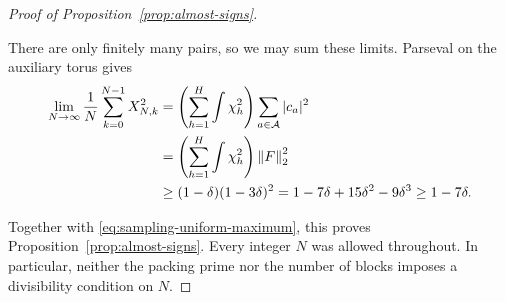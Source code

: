 \begin{proof}[Proof of Proposition~\ref{prop:almost-signs}]
\begin{samepage}
There are only finitely many pairs, so we may sum these limits.  Parseval
on the auxiliary torus gives
\begin{align}
 \lim_{N\to\infty}\frac1N\sum_{k=0}^{N-1}X_{N,k}^2
 &=\left(\sum_{h=1}^H\int\chi_h^2\right)
            \sum_{a\in\mathcal A}|c_a|^2
 \notag\\
 &=\left(\sum_{h=1}^H\int\chi_h^2\right)\left\lVert F\right\rVert_2^2
 \notag\\
 &\ge(1-\delta)(1-3\delta)^2
   =1-7\delta+15\delta^2-9\delta^3
   \ge1-7\delta.\label{eq:sampling-energy-limit}
\end{align}
\end{samepage}
Together with \eqref{eq:sampling-uniform-maximum}, this proves
Proposition~\ref{prop:almost-signs}.
Every integer $N$ was allowed throughout.  In particular, neither the
packing prime nor the number of blocks imposes a divisibility condition
on $N$.
\end{proof}
